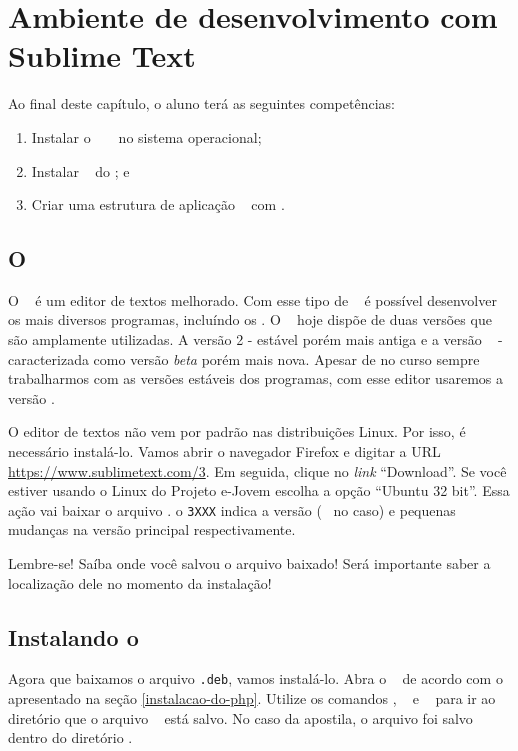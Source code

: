 \chapter{Ambiente de desenvolvimento com Sublime Text}

Ao final deste capítulo, o aluno terá as seguintes competências:
\begin{enumerate}
	\item Instalar o \sublime~ \sublimeversao~ no sistema operacional;
	\item Instalar \plugins~ do \sublime; e
	\item Criar uma estrutura de aplicação \web~ com \php. 
\end{enumerate}

\section{O \sublime}
\label{o-sublime}

O \sublime~ é um editor de textos melhorado. Com esse tipo de \software~
é possível desenvolver os mais diversos programas, incluíndo os \sites. 
O \sublime~ hoje dispõe de duas versões que são amplamente utilizadas. 
A versão 2 - estável porém mais antiga e a versão \sublimeversao~ - caracterizada como 
versão \textit{beta} porém mais nova. Apesar de no curso sempre trabalharmos com 
as versões estáveis dos programas, com esse editor usaremos a versão \sublimeversao.

O editor de textos não vem por padrão nas distribuições Linux. Por isso, é necessário instalá-lo. 
Vamos abrir o navegador Firefox e digitar a URL \url{https://www.sublimetext.com/3}.
Em seguida, clique no \textit{link} ``Download''. Se você estiver usando o Linux do Projeto e-Jovem
escolha a opção ``Ubuntu 32 bit''. Essa ação vai baixar o arquivo \sublimefilename.
o \texttt{3XXX} indica a versão (\sublimeversao~ no caso) e pequenas mudanças na 
versão principal respectivamente.

Lembre-se! Saíba onde você salvou o arquivo baixado! Será importante saber a 
localização dele no momento da instalação!

\section{Instalando o \sublime}
\label{instalando-o-sublime}

Agora que baixamos o arquivo \texttt{.deb}, vamos instalá-lo. Abra o \terminal~ de acordo
com o apresentado na seção \ref{instalacao-do-php}. Utilize os comandos \comandocdcompleto, 
\comandolscompleto~ e \comandopwdcompleto~ para ir ao diretório que o arquivo 
\sublimefilename~ está salvo. No caso da apostila, o arquivo foi salvo dentro do 
diretório .

